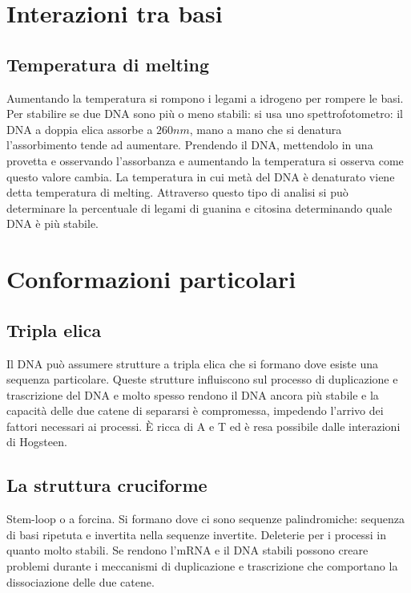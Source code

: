 \section{Interazioni tra basi}
\subsection{Temperatura di melting}
Aumentando la temperatura si rompono i legami a idrogeno per rompere le basi. Per stabilire se due DNA sono pi\`u o meno stabili: si usa uno spettrofotometro: il DNA a doppia elica 
assorbe a $260 nm$, mano a mano che si denatura l'assorbimento tende ad aumentare. Prendendo il DNA, mettendolo in una provetta e osservando l'assorbanza e aumentando la temperatura si 
osserva come questo valore cambia. La temperatura in cui met\`a del DNA \`e denaturato viene detta temperatura di melting. Attraverso questo tipo di analisi si pu\`o determinare la 
percentuale di legami di guanina e citosina determinando quale DNA \`e pi\`u stabile. 
\section{Conformazioni particolari}
\subsection{Tripla elica}
Il DNA pu\`o assumere strutture a tripla elica che si formano dove esiste una sequenza particolare. Queste strutture influiscono sul processo di duplicazione e trascrizione del DNA e 
molto spesso rendono il DNA ancora pi\`u stabile e la capacit\`a delle due catene di separarsi \`e compromessa, impedendo l'arrivo dei fattori necessari ai processi. \`E ricca di A e T  
ed \`e resa possibile dalle interazioni di Hogsteen. 
\subsection{La struttura cruciforme}
Stem-loop o a forcina. Si formano dove ci sono sequenze palindromiche: sequenza di basi ripetuta e invertita nella sequenze invertite. Deleterie per i processi in quanto molto stabili. 
Se rendono l'mRNA e il DNA stabili possono creare problemi durante i meccanismi di duplicazione e trascrizione che comportano la dissociazione delle due catene.
